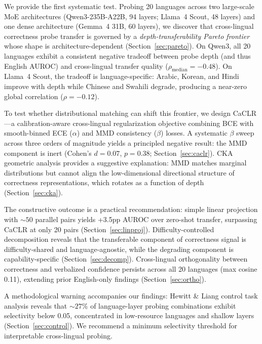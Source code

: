 \documentclass[11pt,a4paper]{article}
\begin{document}
We provide the first systematic test.
Probing 20 languages across two large-scale MoE architectures (Qwen3-235B-A22B, 94 layers; Llama~4 Scout, 48 layers) and one dense architecture (Gemma~4 31B, 60 layers), we discover that cross-lingual correctness probe transfer is governed by a \emph{depth-transferability Pareto frontier} whose shape is architecture-dependent (Section~\ref{sec:pareto}).
On Qwen3, all 20 languages exhibit a consistent negative tradeoff between probe depth (and thus English AUROC) and cross-lingual transfer quality ($\rho_{\text{median}} = -0.48$).
On Llama~4 Scout, the tradeoff is language-specific: Arabic, Korean, and Hindi improve with depth while Chinese and Swahili degrade, producing a near-zero global correlation ($\rho = -0.12$).

To test whether distributional matching can shift this frontier, we design CaCLR---a calibration-aware cross-lingual regularization objective combining BCE with smooth-binned ECE ($\alpha$) and MMD consistency ($\beta$) losses.
A systematic $\beta$ sweep across three orders of magnitude yields a principled negative result: the MMD component is inert (Cohen's $d = 0.07$, $p = 0.38$; Section~\ref{sec:caclr}).
CKA geometric analysis provides a suggestive explanation: MMD matches marginal distributions but cannot align the low-dimensional directional structure of correctness representations, which rotates as a function of depth (Section~\ref{sec:cka}).

The constructive outcome is a practical recommendation: simple linear projection with ${\sim}50$ parallel pairs yields +3.5pp AUROC over zero-shot transfer, surpassing CaCLR at only 20 pairs (Section~\ref{sec:linproj}).
Difficulty-controlled decomposition reveals that the transferable component of correctness signal is difficulty-shared and language-agnostic, while the degrading component is capability-specific (Section~\ref{sec:decomp}).
Cross-lingual orthogonality between correctness and verbalized confidence persists across all 20 languages (max cosine 0.11), extending prior English-only findings (Section~\ref{sec:ortho}).

A methodological warning accompanies our findings: Hewitt \& Liang control task analysis reveals that ${\sim}27\%$ of language-layer probing combinations exhibit selectivity below 0.05, concentrated in low-resource languages and shallow layers (Section~\ref{sec:control}).
We recommend a minimum selectivity threshold for interpretable cross-lingual probing.

\end{document}
